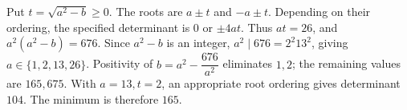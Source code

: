 Put $t=\sqrt{a^2-b}\ge0$. The roots are $a\pm t$ and $-a\pm t$. Depending on their ordering, the specified determinant is $0$ or $\pm4at$. Thus $at=26$, and $a^2(a^2-b)=676$. Since $a^2-b$ is an integer, $a^2\mid676=2^2 13^2$, giving $a\in\{1,2,13,26\}$. Positivity of $b = a^2 - \dfrac{676}{a^2}$ eliminates $1,2$; the remaining values are $165,675$. With $a=13,t=2$, an appropriate root ordering gives determinant $104$. The minimum is therefore $\boxed{165}$.
